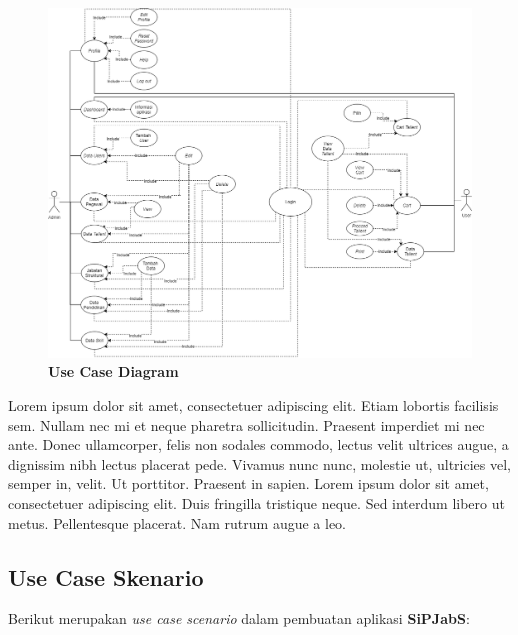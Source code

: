 \begin{figure}
	\centering
	\includegraphics[width=1\textwidth]
	{pics/diagram/usecase.png}
	\caption{\textbf{Use Case Diagram}}
	\label{fig:32}
\end{figure}

Lorem ipsum dolor sit amet, consectetuer adipiscing elit. Etiam lobortis facilisis sem.  Nullam nec mi et neque pharetra sollicitudin.  Praesent imperdiet  mi nec ante. Donec ullamcorper, felis non sodales commodo, lectus velit ultrices augue, a dignissim nibh lectus placerat pede. Vivamus nunc nunc, molestie ut, ultricies vel, semper in, velit. Ut porttitor. Praesent in sapien. Lorem ipsum dolor sit amet, consectetuer adipiscing elit. Duis fringilla tristique neque. Sed interdum libero ut metus. Pellentesque placerat.  Nam rutrum augue a leo.  

\subsection{Use Case Skenario}
Berikut merupakan \textit{use case scenario} dalam pembuatan aplikasi \textbf{SiPJabS}:


